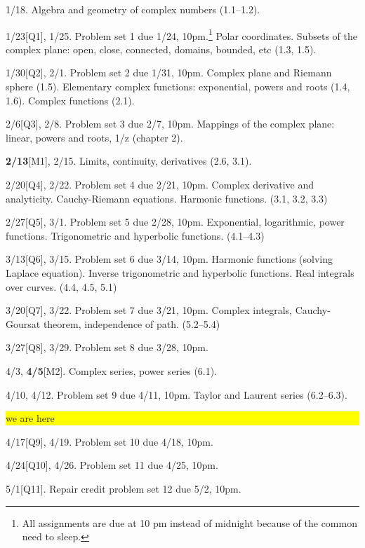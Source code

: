 \documentclass[oneside,11pt]{amsart}
\begin{document}
\begin{enumerate}[\bf{}{[}week 1{]}]
	\item 1/18. Algebra and geometry of complex numbers (1.1--1.2).
	\item 1/23[Q1], 1/25. Problem set 1 due 1/24, 10pm.\footnote{All assignments are due at 10 pm instead of midnight because of the common need to sleep.}
		Polar coordinates. Subsets of the complex plane: open, close, connected, domains, bounded, etc (1.3, 1.5).
	\item 1/30[Q2], 2/1. Problem set 2 due 1/31, 10pm.
		Complex plane and Riemann sphere (1.5).
		Elementary complex functions: exponential, powers and roots (1.4, 1.6).
		Complex functions (2.1).
	\item 2/6[Q3], 2/8. Problem set 3 due 2/7, 10pm.
		Mappings of the complex plane: linear, powers and roots, 1/z (chapter 2).
	\item \textbf{2/13}[M1], 2/15.
		Limits, continuity, derivatives
		(2.6, 3.1).
	\item 2/20[Q4], 2/22. Problem set 4 due 2/21, 10pm.
		Complex derivative and analyticity. Cauchy-Riemann equations.  Harmonic functions.
		(3.1, 3.2, 3.3)
	\item 2/27[Q5], 3/1. Problem set 5 due 2/28, 10pm.
		Exponential, logarithmic, power functions.
		Trigonometric and hyperbolic functions. 
		(4.1--4.3)
	\item 3/13[Q6], 3/15. Problem set 6 due 3/14, 10pm.
		Harmonic functions (solving Laplace equation). 
		Inverse trigonometric and hyperbolic functions. 
		Real integrals over curves.
		(4.4, 4.5, 5.1)
	\item 3/20[Q7], 3/22. Problem set 7 due 3/21, 10pm.
		Complex integrals, Cauchy-Goursat theorem, independence of path.
		(5.2--5.4)
	\item 3/27[Q8], 3/29. Problem set 8 due 3/28, 10pm.
	\item 4/3, \textbf{4/5}[M2]. 
		Complex series, power series (6.1).
	\item 4/10, 4/12. Problem set 9 due 4/11, 10pm.
		Taylor and Laurent series (6.2--6.3).

		\colorbox{yellow}{\parbox{.7\textwidth}{we are here}}
		
	\item 4/17[Q9], 4/19. Problem set 10 due 4/18, 10pm.
	\item 4/24[Q10], 4/26. Problem set 11 due 4/25, 10pm.
	\item 5/1[Q11]. Repair credit problem set 12 due 5/2, 10pm.
\end{enumerate}
\end{document}
